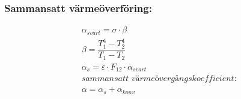 \subsubsection*{Sammansatt värmeöverföring:}
\begin{align*}
	& \alpha_{svart} = \sigma \cdot \beta \\
	& \beta = \dfrac{T_1^4 - T_2^4}{T_1 - T_2} \\
	& \alpha_s = \varepsilon \cdot F_{12} \cdot \alpha_{svart} \\
	& \textit{sammansatt värmeövergångskoefficient:} \\
	& \alpha = \alpha_s + \alpha_{konv}
\end{align*}

